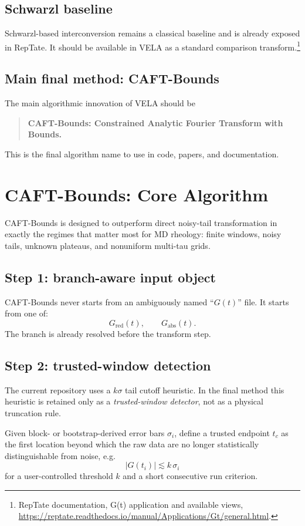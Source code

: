 \documentclass[11pt]{article}
\begin{document}
\subsection{Schwarzl baseline}
Schwarzl-based interconversion remains a classical baseline and is already exposed in RepTate. It should be available in VELA as a standard comparison transform.\footnote{RepTate documentation, G(t) application and available views, \url{https://reptate.readthedocs.io/manual/Applications/Gt/general.html}.}

\subsection{Main final method: CAFT-Bounds}
The main algorithmic innovation of VELA should be
\begin{quote}
\textbf{CAFT-Bounds: Constrained Analytic Fourier Transform with Bounds.}
\end{quote}
This is the final algorithm name to use in code, papers, and documentation.

\section{CAFT-Bounds: Core Algorithm}

CAFT-Bounds is designed to outperform direct noisy-tail transformation in exactly the regimes that matter most for MD rheology: finite windows, noisy tails, unknown plateaus, and nonuniform multi-tau grids.

\subsection{Step 1: branch-aware input object}
CAFT-Bounds never starts from an ambiguously named ``$G(t)$'' file. It starts from one of:
\begin{equation}
G_{\mathrm{red}}(t), \qquad G_{\mathrm{abs}}(t).
\end{equation}
The branch is already resolved before the transform step.

\subsection{Step 2: trusted-window detection}
The current repository uses a $k\sigma$ tail cutoff heuristic. In the final method this heuristic is retained only as a \emph{trusted-window detector}, not as a physical truncation rule.

Given block- or bootstrap-derived error bars $\sigma_i$, define a trusted endpoint $t_c$ as the first location beyond which the raw data are no longer statistically distinguishable from noise, e.g.
\begin{equation}
|G(t_i)| \lesssim k\,\sigma_i
\end{equation}
for a user-controlled threshold $k$ and a short consecutive run criterion.
\end{document}
